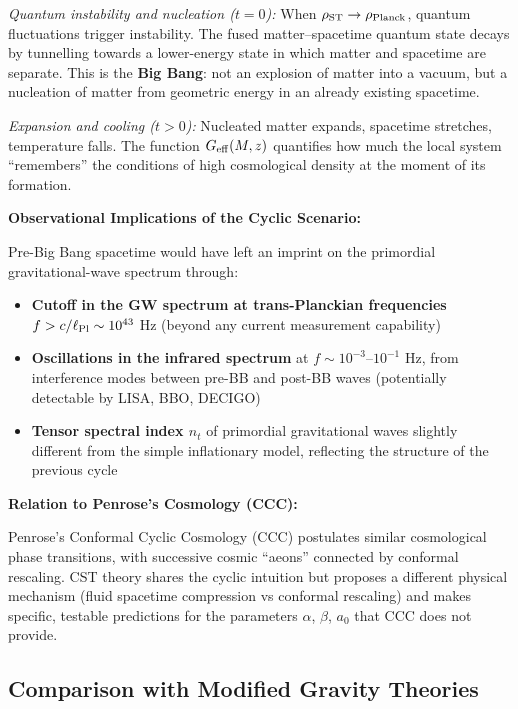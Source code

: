 \documentclass[11pt,a4paper]{article}
\providecommand{\tightlist}{\setlength{\itemsep}{0pt}\setlength{\parskip}{0pt}}
\begin{document}
\emph{Quantum instability and nucleation (\(t = 0\)):} When
\(\rho_{\rm ST} \to \rho_{\rm Planck}\), quantum fluctuations trigger
instability. The fused matter--spacetime quantum state decays by
tunnelling towards a lower-energy state in which matter and spacetime
are separate. This is the \textbf{Big Bang}: not an explosion of matter
into a vacuum, but a nucleation of matter from geometric energy in an
already existing spacetime.

\emph{Expansion and cooling (\(t > 0\)):} Nucleated matter expands,
spacetime stretches, temperature falls. The function
\(G_{\rm eff}(M,z)\) quantifies how much the local system ``remembers''
the conditions of high cosmological density at the moment of its
formation.

\textbf{Observational Implications of the Cyclic Scenario:}

Pre-Big Bang spacetime would have left an imprint on the primordial
gravitational-wave spectrum through:

\begin{itemize}
\tightlist
\item
  \textbf{Cutoff in the GW spectrum at trans-Planckian frequencies}
  \(f > c/\ell_{\rm Pl} \sim 10^{43}\) Hz (beyond any current
  measurement capability)
\item
  \textbf{Oscillations in the infrared spectrum} at
  \(f \sim 10^{-3}\)--\(10^{-1}\) Hz, from interference modes between
  pre-BB and post-BB waves (potentially detectable by LISA, BBO, DECIGO)
\item
  \textbf{Tensor spectral index \(n_t\)} of primordial gravitational
  waves slightly different from the simple inflationary model,
  reflecting the structure of the previous cycle
\end{itemize}

\textbf{Relation to Penrose's Cosmology (CCC):}

Penrose's Conformal Cyclic Cosmology (CCC) postulates similar
cosmological phase transitions, with successive cosmic ``aeons''
connected by conformal rescaling. CST theory shares the cyclic intuition
but proposes a different physical mechanism (fluid spacetime compression
vs conformal rescaling) and makes specific, testable predictions for the
parameters \(\alpha\), \(\beta\), \(a_0\) that CCC does not provide.

\hypertarget{comparison-with-modified-gravity-theories}{%
\subsection{Comparison with Modified Gravity
Theories}\label{comparison-with-modified-gravity-theories}}
\end{document}
